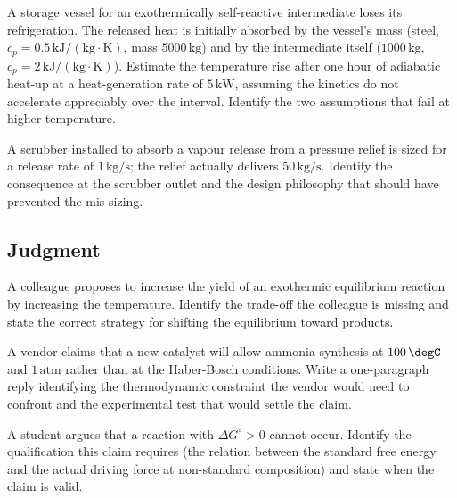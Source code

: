 \begin{exercise}
A storage vessel for an exothermically self-reactive intermediate
loses its refrigeration. The released heat is initially absorbed by
the vessel's mass (steel, $c_p = 0.5\,\text{kJ}/(\text{kg}\cdot
\si{\kelvin})$, mass $5000\,\text{kg}$) and by the intermediate
itself ($1000\,\text{kg}$, $c_p = 2\,\text{kJ}/(\text{kg}\cdot
\si{\kelvin})$). Estimate the temperature rise after one hour of
adiabatic heat-up at a heat-generation rate of $5\,\text{kW}$,
assuming the kinetics do not accelerate appreciably over the
interval. Identify the two assumptions that fail at higher
temperature.
\end{exercise}

\begin{exercise}
A scrubber installed to absorb a vapour release from a pressure
relief is sized for a release rate of $1\,\text{kg}/\si{\second}$; the
relief actually delivers $50\,\text{kg}/\si{\second}$. Identify the
consequence at the scrubber outlet and the design philosophy that
should have prevented the mis-sizing.
\end{exercise}

\subsection*{Judgment}

\begin{exercise}
A colleague proposes to increase the yield of an exothermic
equilibrium reaction by increasing the temperature. Identify the
trade-off the colleague is missing and state the correct strategy
for shifting the equilibrium toward products.
\end{exercise}

\begin{exercise}
A vendor claims that a new catalyst will allow ammonia synthesis at
$100\,\degC$ and $1\,\text{atm}$ rather than at the Haber-Bosch
conditions. Write a one-paragraph reply identifying the thermodynamic
constraint the vendor would need to confront and the experimental
test that would settle the claim.
\end{exercise}

\begin{exercise}
A student argues that a reaction with $\Delta G^\circ > 0$ cannot
occur. Identify the qualification this claim requires (the relation
between the standard free energy and the actual driving force at
non-standard composition) and state when the claim is valid.
\end{exercise}
